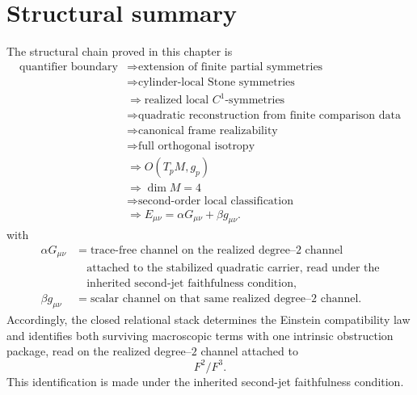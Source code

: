 \section{Structural summary}
\label{sec:einstein-summary}
The structural chain proved in this chapter is
\[
	\begin{aligned}
		\text{quantifier boundary}
			 & \Longrightarrow
		\text{extension of finite partial symmetries}
		\\
			 & \Longrightarrow
		\text{cylinder-local Stone symmetries}
		\\
			 & \Longrightarrow
		\text{realized local }C^1\text{-symmetries}
		\\
			 & \Longrightarrow
		\text{quadratic reconstruction from finite comparison data}
		\\
			 & \Longrightarrow
		\text{canonical frame realizability}
		\\
			 & \Longrightarrow
		\text{full orthogonal isotropy}
		\\
			 & \Longrightarrow O(T_pM,g_p)
		\\
			 & \Longrightarrow \dim M=4
		\\
			 & \Longrightarrow
		\text{second-order local classification}
		\\
			 & \Longrightarrow
		E_{\mu\nu}=\alpha G_{\mu\nu}+\beta g_{\mu\nu}.
	\end{aligned}
\]
with
\[
	\begin{aligned}
		\alpha G_{\mu\nu}
			 & =
		\text{trace-free channel on the realized degree--\(2\) channel}
		\\
			 & \quad\text{attached to the stabilized quadratic carrier, read under the}
		\\
			 & \quad\text{inherited second-jet faithfulness condition},
		\\
		\beta g_{\mu\nu}
			 & =
		\text{scalar channel on that same realized degree--\(2\) channel.}
	\end{aligned}
\]
Accordingly, the closed relational stack determines the Einstein
compatibility law and identifies both surviving macroscopic terms with
one intrinsic obstruction package, read on the realized degree--\(2\)
channel attached to
\[
	F^2/F^3.
\]
This identification is made under the inherited second-jet faithfulness
condition.
